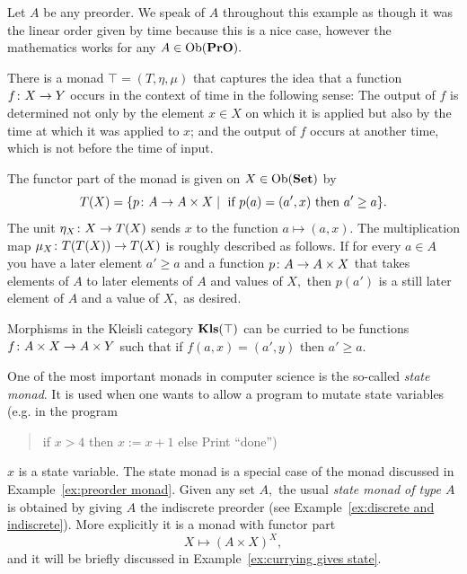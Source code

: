 \documentclass[CT4S-EN-RU]{subfiles}
\begin{document}
\begin{exampleENG}\label{ex:preorder monad}
Let $A$ be any preorder. We speak of $A$ throughout this example as though it was the linear order given by time because this is a nice case, however the mathematics works for any $A\in\textnormal{Ob}({\mathbf{PrO}}).$ 

There is a monad $\top=(T,\eta,\mu)$ that captures the idea that a function $f\colon X\rightarrow Y$ occurs in the context of time in the following sense: The output of $f$ is determined not only by the element $x\in X$ on which it is applied but also by the time at which it was applied to $x$; and the output of $f$ occurs at another time, which is not before the time of input.

The functor part of the monad is given on $X\in\textnormal{Ob}({\mathbf{Set}})$ by
$$T(X)=\{p\colon A\rightarrow A\times X{\;|\;}\textnormal{ if } p(a)=(a',x)\textnormal{ then } a'\geq a\}.$$
The unit $\eta_X\colon X\rightarrow T(X)$ sends $x$ to the function $a\mapsto (a,x).$ The multiplication map $\mu_X\colon T(T(X))\rightarrow T(X)$ is roughly described as follows. If for every $a\in A$ you have a later element $a'\geq a$ and a function $p\colon A\rightarrow A\times X$ that takes elements of $A$ to later elements of $A$ and values of $X,$ then $p(a')$ is a still later element of $A$ and a value of $X,$ as desired.

Morphisms in the Kleisli category ${\mathbf{Kls}}(\top)$ can be curried to be functions $f\colon A\times X\rightarrow A\times Y$ such that if $f(a,x)=(a',y)$ then $a'\geq a.$ 
\end{exampleENG}

\begin{exampleRUS}\label{ex:preorder monad}
\end{exampleRUS}

\begin{remarkENG}\label{rem:state monad}
One of the most important monads in computer science is the so-called {\em state monad}. It is used when one wants to allow a program to mutate state variables (e.g. in the program 
\begin{quote}if $x>4$ then $x:=x+1$ else Print “done”)\end{quote}
$x$ is a state variable. The state monad is a special case of the monad discussed in Example~\ref{ex:preorder monad}. Given any set $A,$ the usual {\em state monad of type $A$} is obtained by giving $A$ the indiscrete preorder (see Example~\ref{ex:discrete and indiscrete}). More explicitly it is a monad with functor part $$X\mapsto (A\times X)^X,$$ and it will be briefly discussed in Example~\ref{ex:currying gives state}.
\end{remarkENG}
\end{document}

